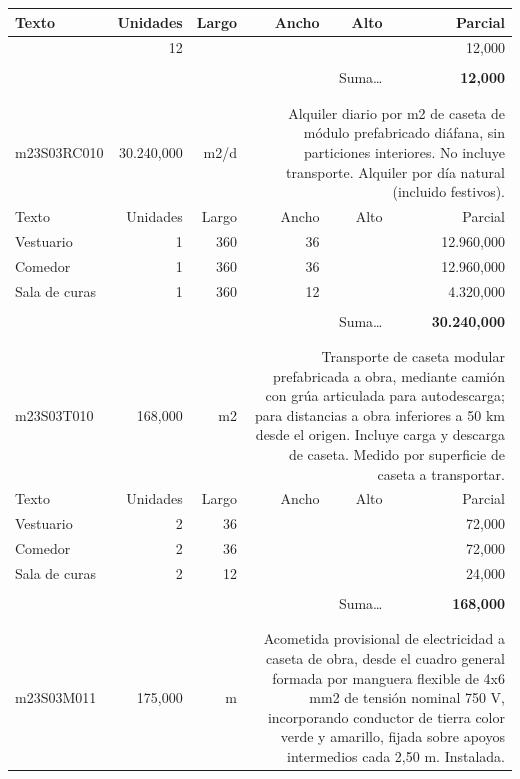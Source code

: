 \documentclass{book}%
\begin{document}
\begin{longtable}{lrrrrr}
Texto&Unidades&Largo&Ancho&Alto&Parcial\\%
\hline%
\multicolumn{1}{p{3.5cm}}{ }&12&&&&    12,000\\%
&&&&&\\%
\multicolumn{5}{r}{Suma\ldots}&\textbf{    12,000}\\%
\hline%
&&&&&\\%
&&&&&\\%
m23S03RC010&30.240,000& m2/d&\multicolumn{3}{p{6cm}}{\scriptsize Alquiler diario por m2 de caseta de módulo prefabricado diáfana, sin particiones interiores. No incluye transporte. Alquiler por día natural (incluido festivos).\normalsize}\\%
Texto&Unidades&Largo&Ancho&Alto&Parcial\\%
\hline%
\multicolumn{1}{p{3.5cm}}{Vestuario}&1&360&36&&12.960,000\\%
\multicolumn{1}{p{3.5cm}}{Comedor}&1&360&36&&12.960,000\\%
\multicolumn{1}{p{3.5cm}}{Sala de curas}&1&360&12&& 4.320,000\\%
&&&&&\\%
\multicolumn{5}{r}{Suma\ldots}&\textbf{30.240,000}\\%
\hline%
&&&&&\\%
&&&&&\\%
m23S03T010&   168,000& m2&\multicolumn{3}{p{6cm}}{\scriptsize Transporte de caseta modular prefabricada a obra, mediante camión con grúa articulada para autodescarga; para distancias a obra inferiores a 50 km desde el origen. Incluye carga y descarga de caseta. Medido por superficie de caseta a transportar.\normalsize}\\%
Texto&Unidades&Largo&Ancho&Alto&Parcial\\%
\hline%
\multicolumn{1}{p{3.5cm}}{Vestuario}&2&36&&&    72,000\\%
\multicolumn{1}{p{3.5cm}}{Comedor}&2&36&&&    72,000\\%
\multicolumn{1}{p{3.5cm}}{Sala de curas}&2&12&&&    24,000\\%
&&&&&\\%
\multicolumn{5}{r}{Suma\ldots}&\textbf{   168,000}\\%
\hline%
&&&&&\\%
&&&&&\\%
m23S03M011&   175,000& m&\multicolumn{3}{p{6cm}}{\scriptsize Acometida provisional de electricidad a caseta de obra, desde el cuadro general formada por manguera flexible de 4x6 mm2 de tensión nominal 750 V, incorporando conductor de tierra color verde y amarillo, fijada sobre apoyos intermedios cada 2,50 m. Instalada.\normalsize}\\%

\end{longtable}
\end{document}
